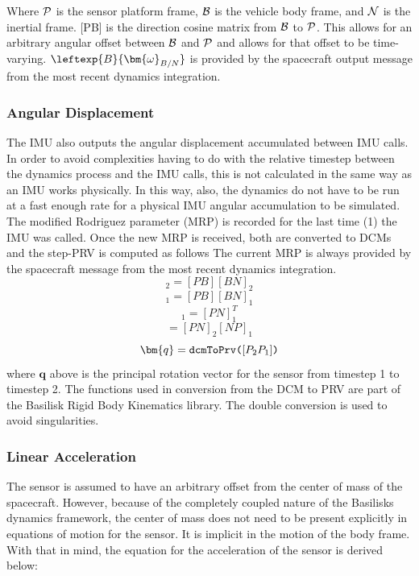 Where $\cal{P}$ is the sensor platform frame, $\cal{B}$ is the vehicle body frame, and $\cal{N}$ is the inertial frame. [PB] is the direction cosine matrix from $\cal{B}$ to $\cal{P}$. This allows for an arbitrary angular offset between $\cal{B}$ and $\cal{P}$ and allows for that offset to be time-varying. $\leftexp{B}{\bm{\omega}_{B/N}}$ is provided by the spacecraft output message from the most recent dynamics integration.

\subsubsection{Angular Displacement}
The IMU also outputs the angular displacement accumulated between IMU calls. In order to avoid complexities having to do with the relative timestep between the dynamics process and the IMU calls, this is not calculated in the same way as an IMU works physically. In this way, also, the dynamics do not have to be run at a fast enough rate for a physical IMU angular accumulation to be simulated.
The modified Rodriguez parameter (MRP) is recorded for the last time (1) the IMU was called. Once the new MRP is received, both are converted to DCMs and the step-PRV is computed as follows The current MRP is always provided by the spacecraft message from the most recent dynamics integration.
\begin{equation}
	[PN]_2 = [PB][BN]_2
\end{equation}
\begin{equation}
	[PN]_1 = [PB][BN]_1
\end{equation}
\begin{equation}
	[NP]_1 = [PN]_1^T
\end{equation}
\begin{equation}
	[P_2P_1] = [PN]_2[NP]_1
\end{equation}
\begin{equation}
\bm{q} = \verb|dcmToPrv(|[P_2P_1]\verb|)|
\end{equation}
where $\bm{q}$ above is the principal rotation vector for the sensor from timestep 1 to timestep 2. The functions used in conversion from the DCM to PRV are part of the Basilisk Rigid Body Kinematics library. The double conversion is used to avoid singularities.

\subsubsection{Linear Acceleration}
The sensor is assumed to have an arbitrary offset from the center of mass of the spacecraft. However, because of the completely coupled nature of the Basilisks dynamics framework, the center of mass does not need to be present explicitly in equations of motion for the sensor. It is implicit in the motion of the body frame. With that in mind, the equation for the acceleration of the sensor is derived below:

